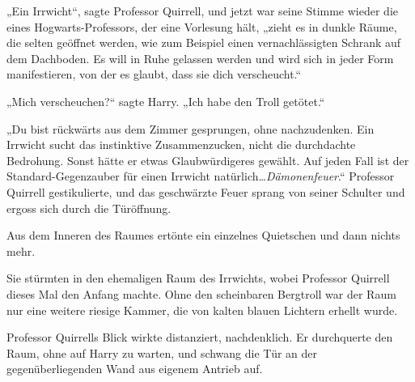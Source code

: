 „Ein Irrwicht“, sagte Professor Quirrell, und jetzt war seine Stimme wieder die eines Hogwarts-Professors, der eine Vorlesung hält, „zieht es in dunkle Räume, die selten geöffnet werden, wie zum Beispiel einen vernachlässigten Schrank auf dem Dachboden. Es will in Ruhe gelassen werden und wird sich in jeder Form manifestieren, von der es glaubt, dass sie dich verscheucht.“

„Mich verscheuchen?“ sagte Harry.
„Ich habe den Troll getötet.“

„Du bist rückwärts aus dem Zimmer gesprungen, ohne nachzudenken. Ein Irrwicht sucht das instinktive Zusammenzucken, nicht die durchdachte Bedrohung. Sonst hätte er etwas Glaubwürdigeres gewählt. Auf jeden Fall ist der Standard-Gegenzauber für einen Irrwicht natürlich…\emph{Dämonenfeuer}.“
Professor Quirrell gestikulierte, und das geschwärzte Feuer sprang von seiner Schulter und ergoss sich durch die Türöffnung.

Aus dem Inneren des Raumes ertönte ein einzelnes Quietschen und dann nichts mehr.

Sie stürmten in den ehemaligen Raum des Irrwichts, wobei Professor Quirrell dieses Mal den Anfang machte. Ohne den scheinbaren Bergtroll war der Raum nur eine weitere riesige Kammer, die von kalten blauen Lichtern erhellt wurde.

Professor Quirrells Blick wirkte distanziert, nachdenklich. Er durchquerte den Raum, ohne auf Harry zu warten, und schwang die Tür an der gegenüberliegenden Wand aus eigenem Antrieb auf.

